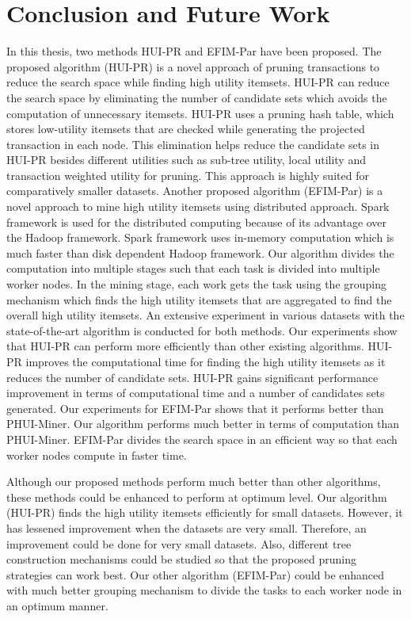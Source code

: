 \documentclass[11pt,openright]{report}
\begin{document}
\chapter{Conclusion and Future Work} \label{chapter:conclusion}
In this thesis, two methods HUI-PR and EFIM-Par have been proposed. The proposed algorithm (HUI-PR) is a novel approach of pruning transactions to reduce the search space while finding high utility itemsets. HUI-PR can reduce the search space by eliminating the number of candidate sets which avoids the computation of unnecessary itemsets. HUI-PR uses a pruning hash table, which stores low-utility itemsets that are checked while generating the projected transaction in each node. This elimination helps reduce the candidate sets in HUI-PR besides different utilities such as sub-tree utility, local utility and transaction weighted utility for pruning. This approach is highly suited for comparatively smaller datasets. Another proposed algorithm (EFIM-Par) is a novel approach to mine high utility itemsets using distributed approach. Spark framework is used for the distributed computing because of its advantage over the Hadoop framework. Spark framework uses in-memory computation which is much faster than disk dependent Hadoop framework. Our algorithm divides the computation into multiple stages such that each task is divided into multiple worker nodes. In the mining stage, each work gets the task using the grouping mechanism which finds the high utility itemsets that are aggregated to find the overall high utility itemsets. An extensive experiment in various datasets with the state-of-the-art algorithm is conducted for both methods. Our experiments show that HUI-PR can perform more efficiently than other existing algorithms. HUI-PR improves the computational time for finding the high utility itemsets as it reduces the number of candidate sets. HUI-PR gains significant performance improvement in terms of computational time and a number of candidates sets generated. Our experiments for EFIM-Par shows that it performs better than PHUI-Miner. Our algorithm performs much better in terms of computation than PHUI-Miner. EFIM-Par divides the search space in an efficient way so that each worker nodes compute in faster time.

Although our proposed methods perform much better than other algorithms, these methods could be enhanced to perform at optimum level. Our algorithm (HUI-PR) finds the high utility itemsets efficiently for small datasets. However, it has lessened improvement when the datasets are very small. Therefore, an improvement could be done for very small datasets. Also, different tree construction mechanisms could be studied so that the proposed pruning strategies can work best. Our other algorithm (EFIM-Par) could be enhanced with much better grouping mechanism to divide the tasks to each worker node in an optimum manner.
\end{document}

